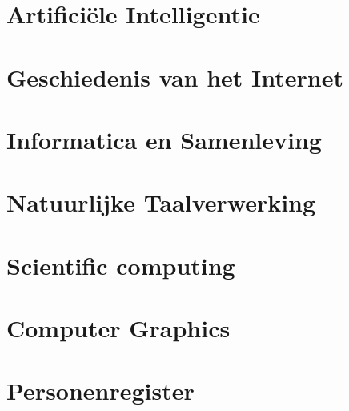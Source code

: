 \documentclass[11pt]{article}
\theoremstyle{definition}
\begin{document}
\section{Artifici\"ele Intelligentie}

\newpage

\section{Geschiedenis van het Internet}

\newpage

\section{Informatica en Samenleving}

\newpage

\section{Natuurlijke Taalverwerking}

\newpage

\section{Scientific computing}

\newpage

\section{Computer Graphics}

\newpage

\appendix
\section{Personenregister}



%
%
\nocite{*}
\end{document}
